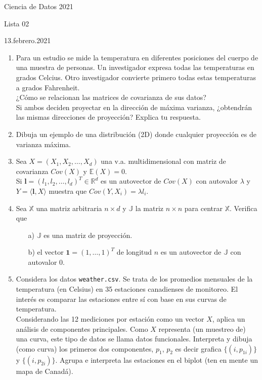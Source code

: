 \documentclass{article}
\newcommand {\bc}{\begin{center}}
\newcommand {\ec}{\end{center}}
\newcommand {\EE}{\mathbb{E}}
\newcommand {\JJ}{\mathbb{J}}
\newcommand {\RR}{\mathbb{R}}
\newcommand {\XX}{\mathbb{X}}
\begin{document}
\begin{sf}
\bc{\Large Ciencia de Datos 2021} \ec
\bc{Lista 02} \ec
\bc{13.febrero.2021} \ec

\bigskip

\begin{enumerate}

\item
Para un estudio se mide la temperatura en diferentes posiciones del
cuerpo de una muestra de personas. Un investigador expresa todas las
temperaturas en grados Celcius. Otro investigador convierte primero
todas estas temperaturas a grados Fahrenheit. \\

¿Cómo se relacionan las matrices de covarianza de sus datos? \\
Si ambos deciden proyectar en la dirección de máxima varianza, ¿obtendrán las mismas direcciones de proyección? Explica tu respuesta.

\bigskip


\item 
Dibuja un ejemplo de una distribución (2D) donde cualquier proyección
es de varianza máxima.

\bigskip


\item 
Sea $X = (X_1,X_2,\ldots,X_d)$ una v.a. multidimensional con matriz de covarianza $Cov(X)$ y
$\EE(X) = 0$. \\
Si $\mathbf{l} = (l_1, l_2, \ldots, l_d)^T \in \RR^d$ es un autovector de $Cov(X)$ con autovalor $\lambda$ y $Y = \langle \mathbf{l}, X \rangle$ muestra que $Cov(Y, X_i) = \lambda l_i$.

\bigskip


\item 
Sea $\XX$ una matriz arbitraria $n \times d$ y $\JJ$ la matriz $n \times n$ para centrar $\XX$. Verifica que
\begin{itemize}
	\item[a)] $\JJ$ es una matriz de proyección.
	\item[b)] el vector $\mathbf{1} = (1,\ldots,1)^T$ de longitud $n$ es un autovector de $\JJ$ con autovalor 0.
\end{itemize}

\bigskip


\item 
Considera los datos \texttt{weather.csv}. Se trata de los promedios mensuales de
la temperatura (en Celsius) en 35 estaciones canadienses de monitoreo.
El interés es comparar las estaciones entre sí con base en sus curvas de
temperatura. \\
Considerando las 12 mediciones por estación como un vector $X$, aplica
un análisis de componentes principales. Como $X$ representa (un muestreo
de) una curva, este tipo de datos se llama datos funcionales. Interpreta
y dibuja (como curva) los primeros dos componentes, $p_1$, $p_2$ es decir
grafica $\{(i, p_{1i})\}$ y $\{(i, p_{2i})\}$. Agrupa e interpreta las estaciones en el biplot (ten en mente un mapa de Canadá).


\end{enumerate}
\end{sf}
\end{document}
